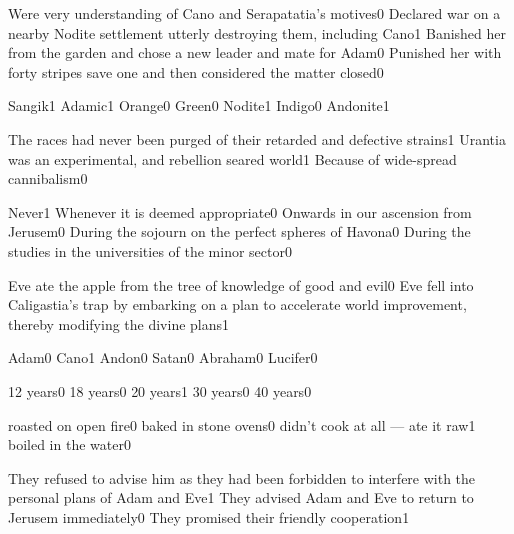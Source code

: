 {Were very understanding of Cano and Serapatatia's motives}{0}
{Declared war on a nearby Nodite settlement utterly destroying them, including Cano}{1}
{Banished her from the garden and chose a new leader and mate for Adam}{0}
{Punished her with forty stripes save one and then considered the matter closed}{0}
\qstop

{Sangik}{1}
{Adamic}{1}
{Orange}{0}
{Green}{0}
{Nodite}{1}
{Indigo}{0}
{Andonite}{1}
\qstop

{The races had never been purged of their retarded and defective strains}{1}
{Urantia was an experimental, and rebellion seared world}{1}
{Because of wide-spread cannibalism}{0}
\qstop

{Never}{1}
{Whenever it is deemed appropriate}{0}
{Onwards in our ascension from Jerusem}{0}
{During the sojourn on the perfect spheres of Havona}{0}
{During the studies in the universities of the minor sector}{0}
\qstop

{Eve ate the apple from the tree of knowledge of good and evil}{0}
{Eve fell into Caligastia's trap by embarking on a plan to accelerate world improvement, thereby modifying the divine plans}{1}
\qstop

{Adam}{0}
{Cano}{1}
{Andon}{0}
{Satan}{0}
{Abraham}{0}
{Lucifer}{0}
\qstop

{12 years}{0}
{18 years}{0}
{20 years}{1}
{30 years}{0}
{40 years}{0}
\qstop

{roasted on open fire}{0}
{baked in stone ovens}{0}
{didn't cook at all --- ate it raw}{1}
{boiled in the water}{0}
\qstop

{They refused to advise him as they had been forbidden to interfere with the personal plans of Adam and Eve}{1}
{They advised Adam and Eve to return to Jerusem immediately}{0}
{They promised their friendly cooperation}{1}
\qstop

